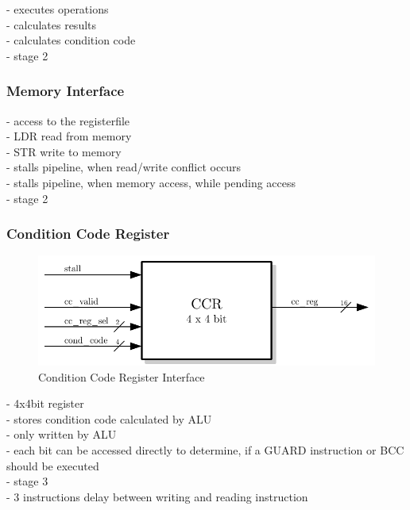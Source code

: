 - executes operations\\
- calculates results\\
- calculates condition code\\
- stage 2\\

\subsubsection{Memory Interface}

- access to the registerfile\\
- LDR read from memory\\
- STR write to memory\\
- stalls pipeline, when read/write conflict occurs\\
- stalls pipeline, when memory access, while pending access\\
- stage 2\\

\subsubsection{Condition Code Register}

\begin{figure}[htb]
 \centering
 \includegraphics[scale=1.0]{images/ccr_blackbox}
 \caption{Condition Code Register Interface}
\label{fig:scp_inf}
\end{figure}

- 4x4bit register\\
- stores condition code calculated by ALU\\
- only written by ALU\\
- each bit can be accessed directly to determine, if a GUARD instruction or BCC should be executed\\
- stage 3\\
- 3 instructions delay between writing and reading instruction\\




